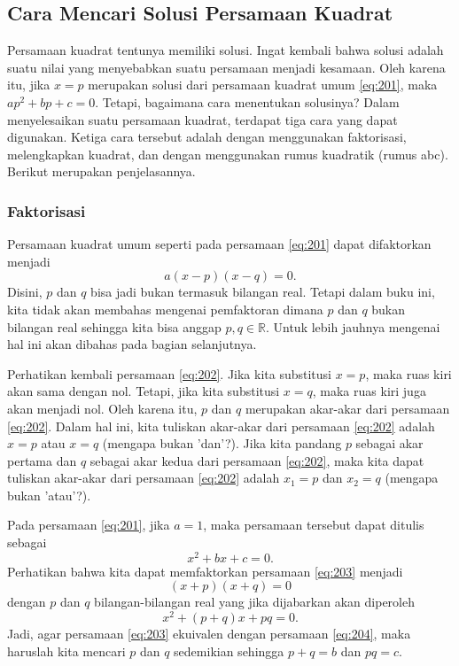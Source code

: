 \subsection{Cara Mencari Solusi Persamaan Kuadrat}

	Persamaan kuadrat tentunya memiliki solusi. Ingat kembali bahwa solusi adalah suatu nilai yang menyebabkan suatu persamaan menjadi kesamaan. Oleh karena itu, jika $ x = p $ merupakan solusi dari persamaan kuadrat umum \ref{eq:201}, maka $ ap^{2} + bp + c = 0 $. Tetapi, bagaimana cara menentukan solusinya? Dalam menyelesaikan suatu persamaan kuadrat, terdapat tiga cara yang dapat digunakan. Ketiga cara tersebut adalah dengan menggunakan faktorisasi, melengkapkan kuadrat, dan dengan menggunakan rumus kuadratik (rumus abc). Berikut merupakan penjelasannya.
	
	\subsubsection{Faktorisasi}
	
		Persamaan kuadrat umum seperti pada persamaan \ref{eq:201} dapat difaktorkan menjadi
		\begin{equation} \label{eq:202}
			a\left(x - p\right)\left(x - q\right) = 0.
		\end{equation}
		Disini, $ p $ dan $ q $ bisa jadi bukan termasuk bilangan real. Tetapi dalam buku ini, kita tidak akan membahas mengenai pemfaktoran dimana $ p $ dan $ q $ bukan bilangan real sehingga kita bisa anggap $ p, q \in \mathbb{R} $. Untuk lebih jauhnya mengenai hal ini akan dibahas pada bagian selanjutnya.
		
		\par Perhatikan kembali persamaan \ref{eq:202}. Jika kita substitusi $ x = p $, maka ruas kiri akan sama dengan nol. Tetapi, jika kita substitusi $ x = q $, maka ruas kiri juga akan menjadi nol. Oleh karena itu, $ p $ dan $ q $ merupakan akar-akar dari persamaan \ref{eq:202}. Dalam hal ini, kita tuliskan akar-akar dari persamaan \ref{eq:202} adalah $ x = p $ atau $ x = q $ (mengapa bukan 'dan'?). Jika kita pandang $ p $ sebagai akar pertama dan $ q $ sebagai akar kedua dari persamaan \ref{eq:202}, maka kita dapat tuliskan akar-akar dari persamaan \ref{eq:202} adalah $ x_{1} = p $ dan $ x_{2} = q $ (mengapa bukan 'atau'?).
		
		\par Pada persamaan \ref{eq:201}, jika $ a = 1 $, maka persamaan tersebut dapat ditulis sebagai
		\begin{equation} \label{eq:203}
			x^{2} + bx + c = 0.
		\end{equation}
		Perhatikan bahwa kita dapat memfaktorkan persamaan \ref{eq:203} menjadi
		\begin{equation} \label{eq:204}
			\left(x + p\right)\left(x + q\right) = 0
		\end{equation}
		dengan $ p $ dan $ q $ bilangan-bilangan real yang jika dijabarkan akan diperoleh
		\[ x^{2} + \left(p + q\right)x + pq = 0. \]
		Jadi, agar persamaan \ref{eq:203} ekuivalen dengan persamaan \ref{eq:204}, maka haruslah kita mencari $ p $ dan $ q $ sedemikian sehingga $ p + q = b $ dan $ pq = c $.
		
